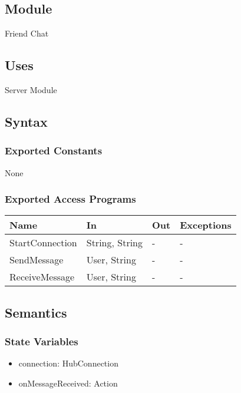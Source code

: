 \documentclass[12pt, titlepage]{article}
\begin{document}
\subsection{Module}

Friend Chat

\subsection{Uses}

Server Module

\subsection{Syntax}

\subsubsection{Exported Constants}

None

\subsubsection{Exported Access Programs}

\begin{center}
\begin{tabular}{p{4cm} p{3cm} p{3cm} p{4cm}}
\hline
\textbf{Name} & \textbf{In} & \textbf{Out} & \textbf{Exceptions} \\
\hline
StartConnection & String, String & - & - \\
SendMessage & User, String & - & - \\
ReceiveMessage & User, String & - & - \\

\hline
\end{tabular}
\end{center}

\subsection{Semantics}

\subsubsection{State Variables}

\begin{itemize}
\item connection: HubConnection
\item onMessageReceived: Action
\end{itemize}
\end{document}
